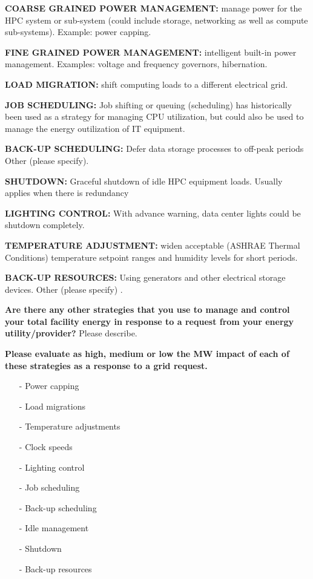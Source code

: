\wl
\noindent
\textbf{COARSE GRAINED POWER MANAGEMENT:}  manage power for the HPC system or sub-system 
(could include storage, networking as well as compute sub-systems). 
Example: power capping. 

\wl
\noindent
\textbf{FINE GRAINED POWER MANAGEMENT:}  intelligent built-in power management.  
Examples: voltage and frequency governors, hibernation.

\wl
\noindent
\textbf{LOAD MIGRATION:}  shift computing loads to a different electrical grid.   

\wl
\noindent
\textbf{JOB SCHEDULING:}  Job shifting or queuing (scheduling) has historically been used as a 
strategy for managing CPU utilization, but could also be used to manage the energy 
outilization of IT equipment. 

\wl
\noindent
\textbf{BACK-UP SCHEDULING:}  Defer data storage processes to off-peak periods  
Other (please specify).	

\wl
\noindent
\textbf{SHUTDOWN:} Graceful shutdown of idle HPC equipment loads. Usually applies when there is redundancy 

\wl
\noindent
\textbf{LIGHTING CONTROL:} With advance warning, data center lights could be shutdown completely. 

\wl
\noindent
\textbf{TEMPERATURE ADJUSTMENT:} widen acceptable (ASHRAE Thermal Conditions) temperature setpoint 
ranges and humidity levels for short periods.  

\wl
\noindent
\textbf{BACK-UP RESOURCES:}  Using generators and other electrical storage devices. 
Other (please specify)	.

\wl
\noindent
\textbf{Are there any other strategies that you use to manage and control your total facility 
energy in response to a request from your energy utility/provider?}
Please describe. 

\wl
\noindent
\textbf{Please evaluate as high, medium or low the MW impact of each of these strategies as a 
response to a grid request. }
\begin{itemize} %
\item[{-}] Power capping	
\item[{-}] Load migrations	
\item[{-}] Temperature adjustments	
\item[{-}] Clock speeds	
\item[{-}] Lighting control	
\item[{-}] Job scheduling	
\item[{-}] Back-up scheduling	
\item[{-}] Idle management	
\item[{-}] Shutdown	
\item[{-}] Back-up resources	
\end{itemize}


